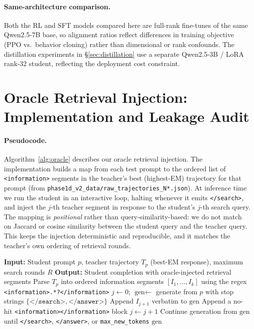 \paragraph{Same-architecture comparison.}
Both the RL and SFT models compared here are full-rank fine-tunes of the same Qwen2.5-7B base, so alignment ratios reflect differences in training objective (PPO vs.\ behavior cloning) rather than dimensional or rank confounds. The distillation experiments in \S\ref{sec:distillation} use a separate Qwen2.5-3B / LoRA rank-32 student, reflecting the deployment cost constraint.

\section{Oracle Retrieval Injection: Implementation and Leakage Audit}
\label{app:oracle_impl}

\paragraph{Pseudocode.}
Algorithm~\ref{alg:oracle} describes our oracle retrieval injection. The implementation builds a map from each test prompt to the ordered list of \texttt{<information>} segments in the teacher's best (highest-EM) trajectory for that prompt (from \texttt{phase1d\_v2\_data/raw\_trajectories\_N*.json}). At inference time we run the student in an interactive loop, halting whenever it emits \texttt{</search>}, and inject the $j$-th teacher segment in response to the student's $j$-th search query. The mapping is \emph{positional} rather than query-similarity-based: we do not match on Jaccard or cosine similarity between the student query and the teacher query. This keeps the injection deterministic and reproducible, and it matches the teacher's own ordering of retrieval rounds.

\begin{algorithm}[h]
\caption{Oracle Retrieval Injection (exp\_009 / exp\_013).}
\label{alg:oracle}
\small
\begin{algorithmic}[1]
\State \textbf{Input:} Student prompt $p$, teacher trajectory $T_p$ (best-EM response), maximum search rounds $R$
\State \textbf{Output:} Student completion with oracle-injected retrieval segments
\State Parse $T_p$ into ordered information segments $[I_1,\ldots,I_k]$ using the regex \texttt{<information>.*?</information>}
\State $j \gets 0$; $\text{gen} \gets$ generate from $p$ with stop strings $\{\texttt{</search>},\texttt{</answer>}\}$
    \State Append $I_{j+1}$ verbatim to $\text{gen}$
  \Else
    \State Append a no-hit \texttt{<information></information>} block
  \EndIf
  \State $j \gets j + 1$
  \State Continue generation from $\text{gen}$ until \texttt{</search>}, \texttt{</answer>}, or \texttt{max\_new\_tokens}
\EndWhile
\State \Return $\text{gen}$
\end{algorithmic}
\end{algorithm}

